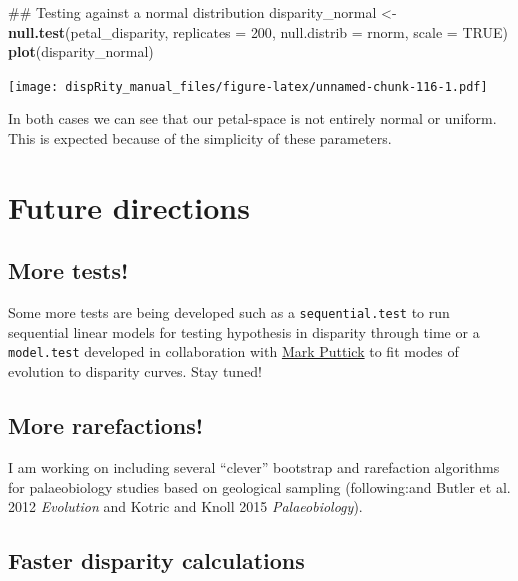\documentclass[]{book}
\newenvironment{Shaded}{\begin{snugshade}}{\end{snugshade}}
\newcommand{\KeywordTok}[1]{\textcolor[rgb]{0.13,0.29,0.53}{\textbf{#1}}}
\newcommand{\DataTypeTok}[1]{\textcolor[rgb]{0.13,0.29,0.53}{#1}}
\newcommand{\DecValTok}[1]{\textcolor[rgb]{0.00,0.00,0.81}{#1}}
\newcommand{\StringTok}[1]{\textcolor[rgb]{0.31,0.60,0.02}{#1}}
\newcommand{\OtherTok}[1]{\textcolor[rgb]{0.56,0.35,0.01}{#1}}
\newcommand{\NormalTok}[1]{#1}
\theoremstyle{definition}
\theoremstyle{definition}
\theoremstyle{remark}
\begin{document}
\begin{Shaded}
\begin{Highlighting}[]
\NormalTok{## Testing against a normal distribution}
\NormalTok{disparity_normal <-}\StringTok{ }\KeywordTok{null.test}\NormalTok{(petal_disparity, }\DataTypeTok{replicates =} \DecValTok{200}\NormalTok{,}
    \DataTypeTok{null.distrib =}\NormalTok{ rnorm, }\DataTypeTok{scale =} \OtherTok{TRUE}\NormalTok{)}
\KeywordTok{plot}\NormalTok{(disparity_normal)}
\end{Highlighting}
\end{Shaded}

\texttt{[image: dispRity\_manual\_files/figure-latex/unnamed-chunk-116-1.pdf]}

In both cases we can see that our petal-space is not entirely normal or
uniform. This is expected because of the simplicity of these parameters.

\chapter{Future directions}\label{future-directions}

\section{More tests!}\label{more-tests}

Some more tests are being developed such as a \texttt{sequential.test}
to run sequential linear models for testing hypothesis in disparity
through time or a \texttt{model.test} developed in collaboration with
\href{https://puttickbiology.wordpress.com/}{Mark Puttick} to fit modes
of evolution to disparity curves. Stay tuned!

\section{More rarefactions!}\label{more-rarefactions}

I am working on including several ``clever'' bootstrap and rarefaction
algorithms for palaeobiology studies based on geological sampling
(following:and Butler et al. 2012 \emph{Evolution} and Kotric and Knoll
2015 \emph{Palaeobiology}).

\section{Faster disparity
calculations}\label{faster-disparity-calculations}
\end{document}
